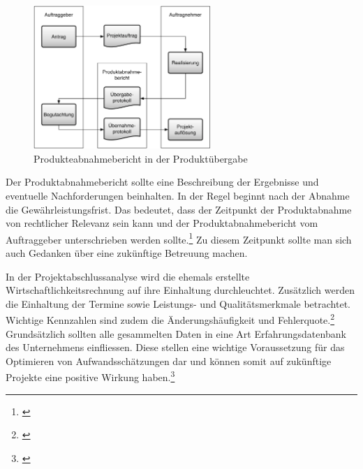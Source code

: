 \begin{figure}[htbp]
\begin{center}
\includegraphics[width=0.6\textwidth,angle=0]{./bilder/theorie/07_produkteuebergabe.pdf}
\caption[Produkteabnahmebericht in der Produktübergabe]{Produkteabnahmebericht in der Produktübergabe\footnotemark}
\label{pic:07_produkteuebergabe}
\end{center}
\end{figure}

Der Produktabnahmebericht sollte eine Beschreibung der Ergebnisse und eventuelle
Nachforderungen beinhalten. In der Regel beginnt nach der Abnahme die
Gewährleistungsfrist. Das bedeutet, dass der Zeitpunkt der Produktabnahme von
rechtlicher Relevanz sein kann und der Produktabnahmebericht vom Auftraggeber
unterschrieben werden sollte.\footnote{\citealp*[Vgl.][S. 86]{cronenbroeck2004handbuch}}
Zu diesem Zeitpunkt sollte man sich auch Gedanken über eine zukünftige Betreuung
machen.

In der Projektabschlussanalyse wird die ehemals erstellte Wirtschaftlichkeitsrechnung
auf ihre Einhaltung durchleuchtet. Zusätzlich werden die Einhaltung der Termine sowie
Leistungs- und Qualitätsmerkmale betrachtet. Wichtige Kennzahlen sind zudem
die Änderungshäufigkeit und Fehlerquote.\footnote{\citealp*[Vgl.][S. 265]{schelle2007projekte}}
Grundsätzlich sollten alle gesammelten Daten in eine Art Erfahrungsdatenbank 
des Unternehmens einfliessen. Diese stellen eine wichtige Voraussetzung für das 
Optimieren von Aufwandsschätzungen dar und können somit auf zukünftige Projekte 
eine positive Wirkung haben.\footnote{\citealp*[Vgl.][S. 275]{burghardt2007einfuehrung}}

\clearpage


